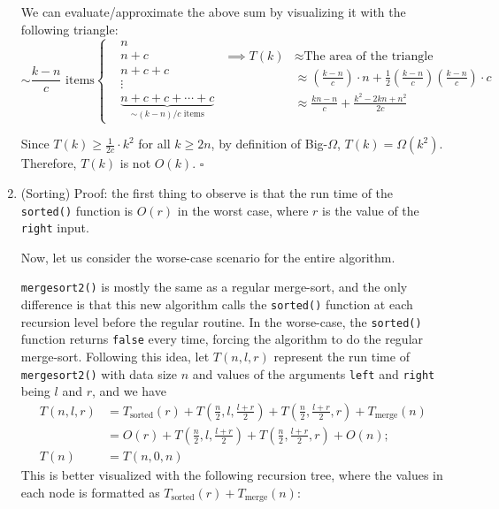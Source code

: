 \documentclass{article}
\begin{document}
\begin{enumerate}
    We can evaluate/approximate the above sum by visualizing it with the following triangle:
    $$
      \sim \frac{k-n}{c}\text{ items} \begin{cases}
         & n                                                               \\
         & n + c                                                           \\
         & n + c + c                                                       \\
         & \vdots                                                          \\
         & \underbrace{n + c + c + \cdots + c}_{\sim (k-n)/c\text{ items}}
      \end{cases}
      \begin{aligned}
        \implies T(k) & \approx \text{The area of the triangle}                                             \\
                      & \approx (\frac{k-n}{c}) \cdot n + \frac{1}{2}(\frac{k-n}{c})(\frac{k-n}{c}) \cdot c \\
                      & \approx \boxed{\frac{kn-n}{c} + \frac{k^2 - 2kn + n^2}{2c}}
      \end{aligned}
    $$

    Since $T(k) \ge \frac{1}{2c} \cdot k^2$ for all $k \ge 2n$, by definition of Big-$\Omega$, $T(k) = \Omega(k^2)$. Therefore, $T(k)$ is not $O(k)$. $\square$

    \pagebreak

  \item (Sorting) Proof: the first thing to observe is that the run time of the {\tt sorted()} function is $O(r)$ in the worst case, where $r$ is the value of the {\tt right} input.

    Now, let us consider the worse-case scenario for the entire algorithm.

      {\tt mergesort2()} is mostly the same as a regular merge-sort, and the only difference is that this new algorithm calls the {\tt sorted()} function at each recursion level before the regular routine. In the worse-case, the {\tt sorted()} function returns {\tt false} every time, forcing the algorithm to do the regular merge-sort. Following this idea, let $T(n, l, r)$ represent the run time of {\tt mergesort2()} with data size $n$ and values of the arguments {\tt left} and {\tt right} being $l$ and $r$, and we have
    $$
      \begin{aligned}
        T(n, l, r) & = T_{\text{sorted}}(r) + T(\frac{n}{2}, l, \frac{l+r}{2})
        + T(\frac{n}{2}, \frac{l+r}{2}, r) + T_{\text{merge}}(n)                                          \\
                   & = O(r) + T(\frac{n}{2}, l, \frac{l+r}{2}) + T(\frac{n}{2}, \frac{l+r}{2}, r) + O(n); \\
        T(n)       & = T(n, 0, n)
      \end{aligned}
    $$
    This is better visualized with the following recursion tree, where the values in each node is formatted as $\boxed{T_{\text{sorted}}(r) + T_{\text{merge}}(n)}$:


\end{enumerate}
\end{document}
